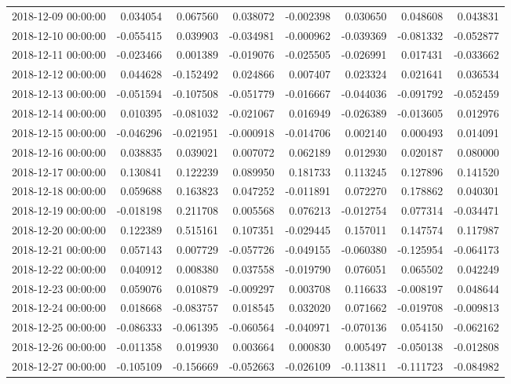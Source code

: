 \begin{tabular}{lrrrrrrr}
2018-12-09 00:00:00 & 0.034054 & 0.067560 & 0.038072 & -0.002398 & 0.030650 & 0.048608 & 0.043831 \\
2018-12-10 00:00:00 & -0.055415 & 0.039903 & -0.034981 & -0.000962 & -0.039369 & -0.081332 & -0.052877 \\
2018-12-11 00:00:00 & -0.023466 & 0.001389 & -0.019076 & -0.025505 & -0.026991 & 0.017431 & -0.033662 \\
2018-12-12 00:00:00 & 0.044628 & -0.152492 & 0.024866 & 0.007407 & 0.023324 & 0.021641 & 0.036534 \\
2018-12-13 00:00:00 & -0.051594 & -0.107508 & -0.051779 & -0.016667 & -0.044036 & -0.091792 & -0.052459 \\
2018-12-14 00:00:00 & 0.010395 & -0.081032 & -0.021067 & 0.016949 & -0.026389 & -0.013605 & 0.012976 \\
2018-12-15 00:00:00 & -0.046296 & -0.021951 & -0.000918 & -0.014706 & 0.002140 & 0.000493 & 0.014091 \\
2018-12-16 00:00:00 & 0.038835 & 0.039021 & 0.007072 & 0.062189 & 0.012930 & 0.020187 & 0.080000 \\
2018-12-17 00:00:00 & 0.130841 & 0.122239 & 0.089950 & 0.181733 & 0.113245 & 0.127896 & 0.141520 \\
2018-12-18 00:00:00 & 0.059688 & 0.163823 & 0.047252 & -0.011891 & 0.072270 & 0.178862 & 0.040301 \\
2018-12-19 00:00:00 & -0.018198 & 0.211708 & 0.005568 & 0.076213 & -0.012754 & 0.077314 & -0.034471 \\
2018-12-20 00:00:00 & 0.122389 & 0.515161 & 0.107351 & -0.029445 & 0.157011 & 0.147574 & 0.117987 \\
2018-12-21 00:00:00 & 0.057143 & 0.007729 & -0.057726 & -0.049155 & -0.060380 & -0.125954 & -0.064173 \\
2018-12-22 00:00:00 & 0.040912 & 0.008380 & 0.037558 & -0.019790 & 0.076051 & 0.065502 & 0.042249 \\
2018-12-23 00:00:00 & 0.059076 & 0.010879 & -0.009297 & 0.003708 & 0.116633 & -0.008197 & 0.048644 \\
2018-12-24 00:00:00 & 0.018668 & -0.083757 & 0.018545 & 0.032020 & 0.071662 & -0.019708 & -0.009813 \\
2018-12-25 00:00:00 & -0.086333 & -0.061395 & -0.060564 & -0.040971 & -0.070136 & 0.054150 & -0.062162 \\
2018-12-26 00:00:00 & -0.011358 & 0.019930 & 0.003664 & 0.000830 & 0.005497 & -0.050138 & -0.012808 \\
2018-12-27 00:00:00 & -0.105109 & -0.156669 & -0.052663 & -0.026109 & -0.113811 & -0.111723 & -0.084982 \\

\end{tabular}
